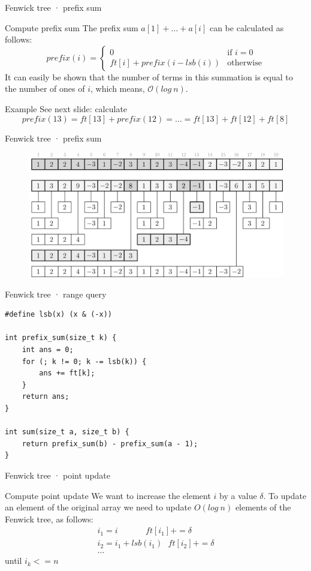 \documentclass{beamer}
\begin{document}
\begin{frame}{Fenwick tree · prefix sum}
\begin{block}{Compute prefix sum}
The prefix sum $a[1] + \dots + a[i]$ can be calculated as follows:
$$prefix(i) = \begin{cases}
0 & \mbox{if } i = 0\\
ft[i] + prefix(i - lsb(i)) & \mbox{otherwise}
\end{cases}$$
It can easily be shown that the number of terms in this summation is equal to the number of ones of $i$, which means, $\mathcal{O} (log~n)$.
\end{block}
\begin{block}{Example}
See next slide: calculate
$$
prefix(13) = ft[13] + prefix(12) = \dots = ft[13] + ft[12] + ft[8]
$$
\end{block}
\end{frame}

\begin{frame}{Fenwick tree · prefix sum}
\begin{figure}
\includegraphics[width=\textwidth]{fenwick2.png}
\end{figure}
\end{frame}

\begin{frame}[fragile]{Fenwick tree · range query}
\begin{lstlisting}
#define lsb(x) (x & (-x))

int prefix_sum(size_t k) {
	int ans = 0;
	for (; k != 0; k -= lsb(k)) {
		ans += ft[k];
	}
	return ans;
}

int sum(size_t a, size_t b) {
	return prefix_sum(b) - prefix_sum(a - 1);
}
\end{lstlisting}
\end{frame}

\begin{frame}{Fenwick tree · point update}
\begin{block}{Compute point update}
We want to increase the element $i$ by a value $\delta$. To update an element of the original array we need to update $O(log~n)$ elements of the Fenwick tree, as follows:
\begin{gather*}
i_1 = i ~~~~~~~~~~~~~~~ ft[i_1] += \delta \\
i_2 = i_1 + lsb(i_1) ~~~ ft[i_2] += \delta \\
\dots
\end{gather*}
until $i_k <= n$
\end{block}
\end{frame}
\end{document}
